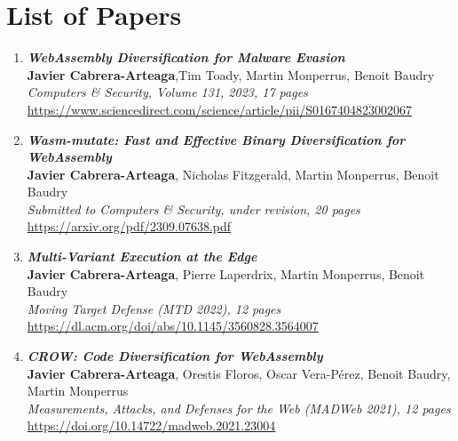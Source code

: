 
\chapter{List of Papers}

\vspace{1cm}
\begin{enumerate}[I]
    \item \textbf{\textit{WebAssembly Diversification for Malware Evasion}} \\
        \textbf{Javier Cabrera-Arteaga},Tim Toady, Martin Monperrus, Benoit Baudry\\
        \textit{Computers \& Security, Volume 131, 2023, 17 pages} \\
        \url{https://www.sciencedirect.com/science/article/pii/S0167404823002067}
    \item \textbf{\textit{Wasm-mutate: Fast and Effective Binary Diversification for
    WebAssembly}} \\
        \textbf{Javier Cabrera-Arteaga}, Nicholas Fitzgerald, Martin Monperrus, Benoit Baudry\\
        \textit{Submitted to Computers \& Security, under revision, 20 pages} \\
        \url{https://arxiv.org/pdf/2309.07638.pdf}    
    \item \textbf{\textit{Multi-Variant Execution at the Edge}} \\
    \textbf{Javier Cabrera-Arteaga}, Pierre Laperdrix, Martin Monperrus, Benoit Baudry\\
    \textit{Moving Target Defense (MTD 2022), 12 pages} \\
    \url{https://dl.acm.org/doi/abs/10.1145/3560828.3564007}

    \item \textbf{\textit{CROW: Code Diversification for WebAssembly}} \\
        \textbf{Javier Cabrera-Arteaga}, Orestis Floros, Oscar Vera-Pérez, Benoit Baudry, Martin Monperrus\\
        \textit{ Measurements, Attacks, and Defenses for the Web (MADWeb 2021), 12 pages} \\
        \url{https://doi.org/10.14722/madweb.2021.23004}
    

\end{enumerate}
